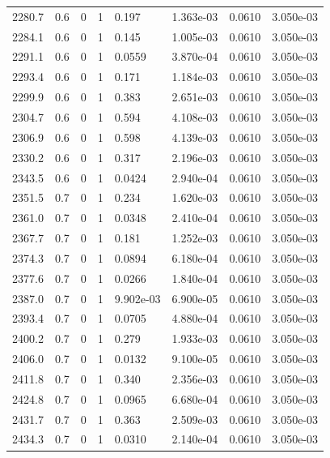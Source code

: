 \documentclass[preview]{standalone}
\begin{document}
{{{{{{{{{{\begin{tabular}{L{1.2cm}C{1.2cm} C{0.3cm}C{0.5cm} C{1.4cm}C{1.4cm} C{1.4cm}C{1.4cm}}
  2280.7  &   0.6  & 0     &  1 &  0.197  & 1.363e-03  & 0.0610 &  3.050e-03   \\ 
  2284.1  &   0.6  & 0     &  1 &  0.145  & 1.005e-03  & 0.0610 &  3.050e-03   \\ 
  2291.1  &   0.6  & 0     &  1 &  0.0559  & 3.870e-04  & 0.0610 &  3.050e-03   \\ 
  2293.4  &   0.6  & 0     &  1 &  0.171  & 1.184e-03  & 0.0610 &  3.050e-03   \\ 
  2299.9  &   0.6  & 0     &  1 &  0.383  & 2.651e-03  & 0.0610 &  3.050e-03   \\ 
  2304.7  &   0.6  & 0     &  1 &  0.594  & 4.108e-03  & 0.0610 &  3.050e-03   \\ 
  2306.9  &   0.6  & 0     &  1 &  0.598  & 4.139e-03  & 0.0610 &  3.050e-03   \\ 
  2330.2  &   0.6  & 0     &  1 &  0.317  & 2.196e-03  & 0.0610 &  3.050e-03   \\ 
  2343.5  &   0.6  & 0     &  1 &  0.0424  & 2.940e-04  & 0.0610 &  3.050e-03   \\ 
  2351.5  &   0.7  & 0     &  1 &  0.234  & 1.620e-03  & 0.0610 &  3.050e-03   \\ 
  2361.0  &   0.7  & 0     &  1 &  0.0348  & 2.410e-04  & 0.0610 &  3.050e-03   \\ 
  2367.7  &   0.7  & 0     &  1 &  0.181  & 1.252e-03  & 0.0610 &  3.050e-03   \\ 
  2374.3  &   0.7  & 0     &  1 &  0.0894  & 6.180e-04  & 0.0610 &  3.050e-03   \\ 
  2377.6  &   0.7  & 0     &  1 &  0.0266  & 1.840e-04  & 0.0610 &  3.050e-03   \\ 
  2387.0  &   0.7  & 0     &  1 &  9.902e-03  & 6.900e-05  & 0.0610 &  3.050e-03   \\ 
  2393.4  &   0.7  & 0     &  1 &  0.0705  & 4.880e-04  & 0.0610 &  3.050e-03   \\ 
  2400.2  &   0.7  & 0     &  1 &  0.279  & 1.933e-03  & 0.0610 &  3.050e-03   \\ 
  2406.0  &   0.7  & 0     &  1 &  0.0132  & 9.100e-05  & 0.0610 &  3.050e-03   \\ 
  2411.8  &   0.7  & 0     &  1 &  0.340  & 2.356e-03  & 0.0610 &  3.050e-03   \\ 
  2424.8  &   0.7  & 0     &  1 &  0.0965  & 6.680e-04  & 0.0610 &  3.050e-03   \\ 
  2431.7  &   0.7  & 0     &  1 &  0.363  & 2.509e-03  & 0.0610 &  3.050e-03   \\ 
  2434.3  &   0.7  & 0     &  1 &  0.0310  & 2.140e-04  & 0.0610 &  3.050e-03   \\ 

\end{tabular}}}}}}}}}}}
\end{document}
